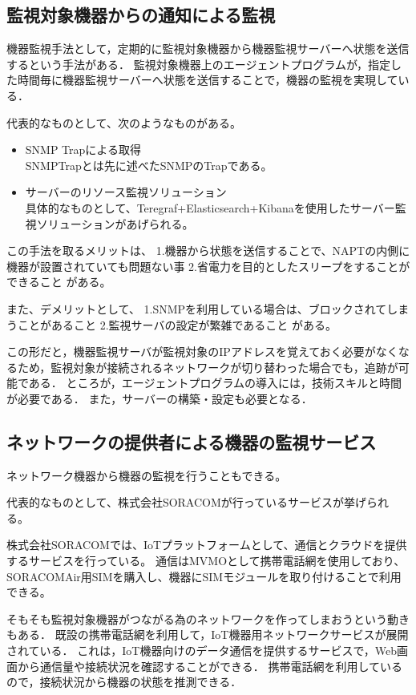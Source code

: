 \subsection{監視対象機器からの通知による監視}
	機器監視手法として，定期的に監視対象機器から機器監視サーバーへ状態を送信するという手法がある．
	監視対象機器上のエージェントプログラムが，指定した時間毎に機器監視サーバーへ状態を送信することで，機器の監視を実現している．
	\medskip
	
	代表的なものとして、次のようなものがある。
	\begin{itemize}
		\item SNMP Trapによる取得\\
			SNMPTrapとは先に述べたSNMPのTrapである。
		\item サーバーのリソース監視ソリューション\\
			具体的なものとして、Teregraf+Elasticsearch+Kibanaを使用したサーバー監視ソリューションがあげられる。
	\end{itemize}
	
	この手法を取るメリットは、
	1.機器から状態を送信することで、NAPTの内側に機器が設置されていても問題ない事
	2.省電力を目的としたスリープをすることができること
	がある。

	また、デメリットとして、
	1.SNMPを利用している場合は、ブロックされてしまうことがあること
	2.監視サーバの設定が繁雑であること
	がある。

	この形だと，機器監視サーバが監視対象のIPアドレスを覚えておく必要がなくなるため，監視対象が接続されるネットワークが切り替わった場合でも，追跡が可能である．
	ところが，エージェントプログラムの導入には，技術スキルと時間が必要である．
	また，サーバーの構築・設定も必要となる．

\subsection{ネットワークの提供者による機器の監視サービス} %
	ネットワーク機器から機器の監視を行うこともできる。

	代表的なものとして、株式会社SORACOMが行っているサービスが挙げられる。

	株式会社SORACOMでは、IoTプラットフォームとして、通信とクラウドを提供するサービスを行っている。
	通信はMVMOとして携帯電話網を使用しており、SORACOMAir用SIMを購入し、機器にSIMモジュールを取り付けることで利用できる。

	

	そもそも監視対象機器がつながる為のネットワークを作ってしまおうという動きもある．
	既設の携帯電話網を利用して，IoT機器用ネットワークサービスが展開されている．
	これは，IoT機器向けのデータ通信を提供するサービスで，Web画面から通信量や接続状況を確認することができる．
	携帯電話網を利用しているので，接続状況から機器の状態を推測できる．

